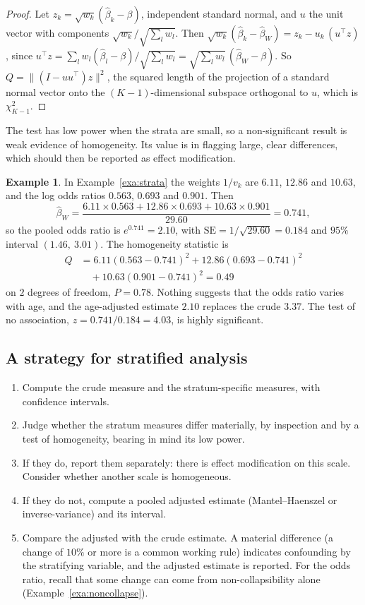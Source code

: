 \documentclass[11pt,a4paper]{article}
\numberwithin{equation}{section}
\theoremstyle{definition}
\newtheorem{exa}[thm]{Example}
\begin{document}
\begin{proof}
Let $z_k = \sqrt{w_k}(\hat\beta_k - \beta)$, independent standard normal, and $u$ the unit vector with components $\sqrt{w_k}/\sqrt{\sum_l w_l}$. Then
$\sqrt{w_k}(\hat\beta_k - \hat\beta_W) = z_k - u_k\,(u^\top z)$, since $u^\top z = \sum_l w_l(\hat\beta_l - \beta)/\sqrt{\sum_l w_l} = \sqrt{\sum_l w_l}\,(\hat\beta_W - \beta)$. So $Q = \|(I - uu^\top)z\|^2$,
the squared length of the projection of a standard normal vector onto the $(K - 1)$-dimensional subspace orthogonal to $u$, which is $\chi^2_{K - 1}$.
\end{proof}

The test has low power when the strata are small, so a non-significant result is weak evidence of homogeneity. Its value is in
flagging large, clear differences, which should then be reported as effect modification.

\begin{exa}
\label{exa:woolftest}
In Example~\ref{exa:strata} the weights $1/v_k$ are $6.11$, $12.86$ and $10.63$, and the log odds ratios $0.563$, $0.693$ and $0.901$. Then
\[
\hat\beta_W = \frac{6.11 \times 0.563 + 12.86 \times 0.693 + 10.63 \times 0.901}{29.60} = 0.741 ,
\]
so the pooled odds ratio is $e^{0.741} = 2.10$, with $\text{SE} = 1/\sqrt{29.60} = 0.184$ and $95\%$ interval $(1.46,\ 3.01)$. The homogeneity statistic is
\begin{align*}
Q &= 6.11(0.563 - 0.741)^2 + 12.86(0.693 - 0.741)^2 \\
&\quad + 10.63(0.901 - 0.741)^2 = 0.49
\end{align*}
on $2$ degrees of freedom, $P = 0.78$. Nothing suggests that the odds ratio varies with age, and the age-adjusted estimate $2.10$ replaces the
crude $3.37$. The test of no association, $z = 0.741/0.184 = 4.03$, is highly significant.
\end{exa}

\subsection{A strategy for stratified analysis}

\begin{enumerate}
\item Compute the crude measure and the stratum-specific measures, with confidence intervals.
\item Judge whether the stratum measures differ materially, by inspection and by a test of homogeneity, bearing in mind its low power.
\item If they do, report them separately: there is effect modification on this scale. Consider whether another scale is homogeneous.
\item If they do not, compute a pooled adjusted estimate (Mantel--Haenszel or inverse-variance) and its interval.
\item Compare the adjusted with the crude estimate. A material difference (a change of $10\%$ or more is a common working rule) indicates
confounding by the stratifying variable, and the adjusted estimate is reported. For the odds ratio, recall that some change can come
from non-collapsibility alone (Example~\ref{exa:noncollapse}).
\end{enumerate}
\end{document}
